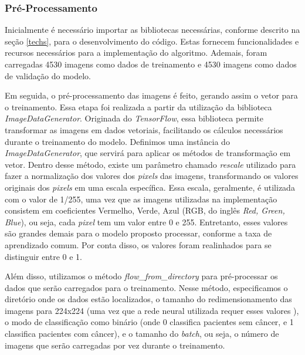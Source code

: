 
\subsubsection{\esp Pré-Processamento} \label{preprocess}
Inicialmente é necessário importar as bibliotecas necessárias, conforme descrito na seção \ref{techs}, para o desenvolvimento do código. Estas fornecem funcionalidades e recursos necessários para a implementação do algoritmo. Ademais, foram carregadas 4530 imagens como dados de treinamento e 4530 imagens como dados de validação do modelo.

Em seguida, o pré-processamento das imagens é feito, gerando assim o vetor para o treinamento. Essa etapa foi realizada a partir da utilização da biblioteca \textit{ImageDataGenerator}. Originada do \textit{TensorFlow}, essa biblioteca permite transformar as imagens em dados vetoriais, facilitando os cálculos necessários durante o treinamento do modelo. Definimos uma instância do \textit{ImageDataGenerator}, que servirá para aplicar os métodos de transformação em vetor. Dentro desse método, existe um parâmetro chamado \textit{rescale} utilizado para fazer a normalização dos valores dos \textit{pixels} das imagens, transformando os valores originais dos \textit{pixels} em uma escala específica. Essa escala, geralmente, é utilizada com o valor de 1/255, uma vez que as imagens utilizadas na implementação consistem em coeficientes Vermelho, Verde, Azul (RGB, do inglês \textit{Red, Green, Blue}), ou seja, cada \textit{pixel} tem um valor entre 0 e 255. Entretanto, esses valores são grandes demais para o modelo proposto processar, conforme a taxa de aprendizado comum. Por conta disso, os valores foram realinhados para se distinguir entre 0 e 1.



Além disso, utilizamos o método \textit{flow\_from\_directory} para pré-processar os dados que serão carregados para o treinamento. Nesse método, especificamos o diretório onde os dados estão localizados, o tamanho do redimensionamento das imagens para 224x224 (uma vez que a rede neural utilizada requer esses valores ), o modo de classificação como binário (onde 0 classifica pacientes sem câncer, e 1 classifica pacientes com câncer), e o tamanho do \textit{batch}, ou seja, o número de imagens que serão carregadas por vez durante o treinamento.

